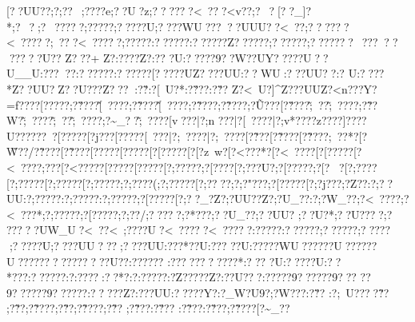 {{{{{{{{{{{{{{{{{{{{{{{{{{{{{{{{{{{{{{{{{{{{{{{{{{{{{{{{{{{{{{{{{{{{{{{{{{{{{{{{{{{{{{{{{{{{{{{{{{{{{{{{{{{{{{{{{{{{{{{{{{{{{{{{{{{{{{{{{{{{{{{{{{{{{{{{{{{{{{{{{{{{{{{{{{{{{{{{{{{{{{{{{{{{{{{{{{{{{{{{{{{{{{{{{{{{{{{{{{{{{{{{{{{{{{{{{{{{{{{{{{{{{{{{{{{{{{{{{{{{{{{{{{{{{{{{{{{{{{{{{{{{{{{{{{{{{{{{{{{{{{{{{{{{{{{{{{{{{{{{{{{{{{{{{{{{{{{{{{{{{{{{{{{{{{{{{{{{{{{{{{{{{{{{{{{{{{{{{{{{{{{{{{{{{{{{{{{{{{{{{{{{{{{{{{{{{{{{{{{{{{{{{{{{{{{{{{{{{{{{{{{{{{{{{{{{{{{{{{{{{{{{{{{{{{{{{{{{{{{{{{{{{{{{{{{{{{{{{{{{{{{{{{{{{{{{{{{{{{{{{{{{{{{{{{{{{{{{{{{{{{{{{{{{{{{{{{{{{{{{{{{{{{{{{{{{{{{{{{{{{{{{{{{{{{{{{{{{{{{{{{{{{{{{{{{{{{{{{{{{{{{{{{{{{{{{{{{{{{{{{{{{{{{{{{{{{{{{{{{{{{{{{{{{{{{{{{{{{{{{{{{{{{{{{{{{{{{{{{{{{{{{{{{{{{{{{{{{{{{{{{{{{{{{{{{{{{{{{{{{{{{{{{{{{{{{{{{{{{{{{{{{{{{{{{{{{{{{{{{{{{{{{{{{{{{{{{{{{{{{{{{{{{{{{{{{{[??UU??;?;?   ?~;????e;??U?z;??????<~  ???<v  ??;?~  ?[??_]?*;?~?  ;?~?????;?????;?????U;????WU??}  ???UUU??<~??  ;??????<~?????;~ ??}?<~?????;?????:??????:??????Z??????;??????;???????~??????????U??
Z???+
 Z?:????Z?:??
?U:??? ??9??W??UY?????U??U__U:?????:??????:??????[?????UZ????UU:??WU:???UU??:?
  U:????* Z??UU?Z??U???Z??? :?\v?   :?[~U? *:?\v??? :?\v??
 Z?<~U?  ]^Z???UUZ?<n??? Y?=f????[?\n????;?\v????\~[~????;?\~????\~[~????;?\~????;?\~????;?\~U???[?\v????\~;~??\~;~????;?\~??W?\~;~????\~;~??\~;~????;?\~_??\~;~????\?[v???|?;n
???|?[~????|?;v*???{?\?z???{?\?]???{?\?U???{?\???~?\?[?????[?\?j???[?\?????\?[~? ??|?;~????|?;~????[?\~???[?\~????[?\~????\?;~??*?[?\~W??/{?\~????[?\~????[?\?????[?\?????[?[?????[?[?z~w?[?<???*?[?<~????[?[?????[?<~????;?\???[?<?????[?\?????[?\?????[?;?????;?[????[?;???U?;?[?????;?[??[?;? ???[?;?????[?;?????[?;?????;?;????(;?;?????[?;????;?;?"???;?[?????[?;?j???;?Z??   :?;??UU:?;?????:?;?????:?;?????;?[?????[?;??_?Z?;?UU??Z?;?U_??:?;?W_??;?<~????;?<~???*;?;?????;?[?????;?;?  ?/;???? ?;?*???;??U_??;??UU?
;??U?* ;??U????;?
?????UW_U?<~??<~;????U?<~?????<~?????:?????:??????;??????;?????;?????U;????UU???  ;????UU:???*??U:???
??U:?????WU??????U??????U??? ????????????U??:??????
:???????????*:???	?U:?????U:??*???:??????:?:????:??  *?:?:?????:?Z?????Z?:??U???:?????9??????9???
??9??????9??????:?????Z?:???UU:?? ???Y?:?_W?U9?;?W???:?\v??  :?;~U????\~??
 ;?\~??  ;?\~????;?\~??;?\~????;?\~??
;?\~??? :?\v???
:?\~??? :?\v??? ;?\~????[?\~_??
}}}}}}}}}}}}}}}}}}}}}}}}}}}}}}}}}}}}}}}}}}}}}}}}}}}}}}}}}}}}}}}}}}}}}}}}}}}}}}}}}}}}}}}}}}}}}}}}}}}}}}}}}}}}}}}}}}}}}}}}}}}}}}}}}}}}}}}}}}}}}}}}}}}}}}}}}}}}}}}}}}}}}}}}}}}}}}}}}}}}}}}}}}}}}}}}}}}}}}}}}}}}}}}}}}}}}}}}}}}}}}}}}}}}}}}}}}}}}}}}}}}}}}}}}}}}}}}}}}}}}}}}}}}}}}}}}}}}}}}}}}}}}}}}}}}}}}}}}}}}}}}}}}}}}}}}}}}}}}}}}}}}}}}}}}}}}}}}}}}}}}}}}}}}}}}}}}}}}}}}}}}}}}}}}}}}}}}}}}}}}}}}}}}}}}}}}}}}}}}}}}}}}}}}}}}}}}}}}}}}}}}}}}}}}}}}}}}}}}}}}}}}}}}}}}}}}}}}}}}}}}}}}}}}}}}}}}}}}}}}}}}}}}}}}}}}}}}}}}}}}}}}}}}}}}}}}}}}}}}}}}}}}}}}}}}}}}}}}}}}}}}}}}}}}}}}}}}}}}}}}}}}}}}}}}}}}}}}}}}}}}}}}}}}}}}}}}}}}}}}}}}}}}}}}}}}}}}}}}}}}}}}}}}}}}}}}}}}}}}}}}}}}}}}}}}}}}}}}}}}}}}}}}}}}}}}}}}}}}}}}}}}}}}}}}}}}}}}}}}}}}}}}}}}}}}}}}}}}}}}}}}}}}}}}}}}}}}}}}}}}}}}}}}}}}}}}}}}}}}}}}}}}}}}}}}}}}}}}}}}}}}}}}}}}}}}}}}}}}}}}}}}}}}}}}}}}}}}
